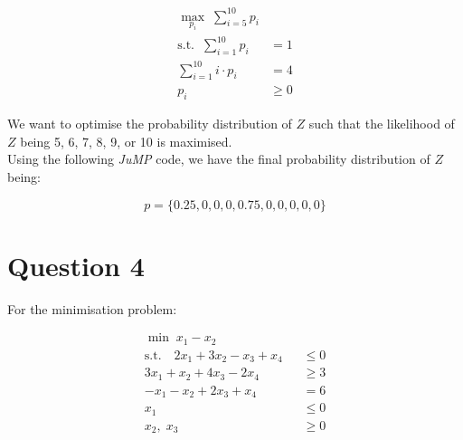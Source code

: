 \documentclass[12pt]{article}
\begin{document}
\begin{align*}
    \max_{p_i} \; \sum_{i=5}^{10} p_i & \\ 
    \text{s.t.} \; \; \sum_{i=1}^{10} p_i &= 1 \\ 
    \sum_{i=1}^{10} i \cdot p_i &= 4 \\ 
    p_i &\geq 0
\end{align*}

\noindent We want to optimise the probability distribution of $Z$ such that the likelihood of $Z$ being 5, 6, 7, 8, 9, or 10 is maximised. \\ 

\noindent Using the following \textit{JuMP} code, we have the final probability distribution of $Z$ being: 

\begin{equation*}
    \boxed{p = \{0.25, 0, 0, 0, 0.75, 0, 0, 0, 0, 0\}}
\end{equation*}

    
    
    
    
    


\newpage

\section*{Question 4}
For the minimisation problem: 

\begin{align*}
    \min \; x_{1}-x_{2} \qquad \qquad \qquad & \\ 
    \text{s.t.} \quad 2 x_{1} + 3 x_{2} - x_{3} + x_{4} & \leq 0 \\ 
    3 x_{1} + x_{2} + 4 x_{3} - 2 x_{4} & \geq 3 \\ 
    - x_{1} - x_{2} + 2 x_{3} + x_{4} & = 6 \\ 
    x_{1} &\leq 0 \\ 
    x_{2},\; x_{3} & \geq 0 
\end{align*}
\end{document}
